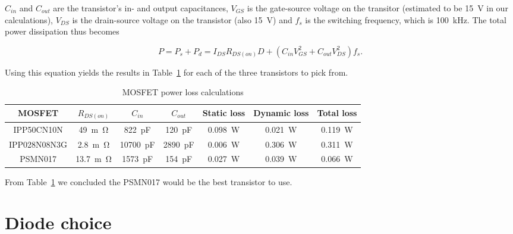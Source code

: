\documentclass[11pt,titlepage]{report}
\begin{document}
$C_{in}$ and $C_{out}$ are the transistor's in- and output capacitances, $V_{GS}$ is the gate-source voltage on the transitor (estimated to be \SI{15}{V} in our calculations), $V_{DS}$ is the drain-source voltage on the transistor (also \SI{15}{V}) and $f_{s}$ is the switching frequency, which is \SI{100}{kHz}.
The total power dissipation thus becomes

\begin{equation}
P = P_{s} + P_{d} = I_{DS}R_{DS(on)}D + (C_{in}V_{GS}^2 + C_{out}V_{DS}^2)f_{s} .
\end{equation}

Using this equation yields the results in Table~\ref{tab:ass1-power-loss} for each of the three transistors to pick from.

\begin{table}[H]
	\centering
	\caption{MOSFET power loss calculations}
	\label{tab:ass1-power-loss}
	\begin{tabular}{c c c c c c c}
		\hline\hline
		MOSFET & $R_{DS(on)}$ & $C_{in}$ & $C_{out}$ & Static loss & Dynamic loss & Total loss \\
		\hline
		IPP50CN10N & \SI{49}{m\ohm} & \SI{822}{pF} & \SI{120}{pF} & \SI{0.098}{W} & \SI{0.021}{W} & \SI{0.119}{W} \\
		IPP028N08N3G & \SI{2.8}{m\ohm} & \SI{10700}{pF} & \SI{2890}{pF} & \SI{0.006}{W} & \SI{0.306}{W} & \SI{0.311}{W} \\
		PSMN017 & \SI{13.7}{m\ohm} & \SI{1573}{pF} & \SI{154}{pF} & \SI{0.027}{W} & \SI{0.039}{W} & \SI{0.066}{W} \\
		\hline
		\end{tabular}
\end{table}

From Table~\ref{tab:ass1-power-loss} we concluded the PSMN017 would be the best transistor to use.

\section*{Diode choice}
\end{document}
